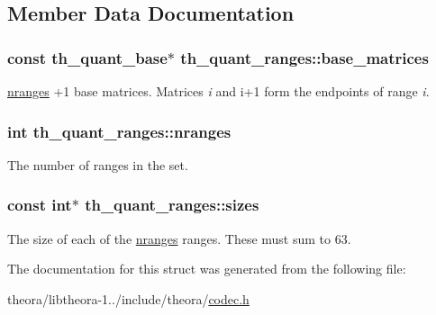 \subsection{Member Data Documentation}
\hypertarget{structth__quant__ranges_a52cb432f034737087492ea448de20bdb}{
\subsubsection[{base\+\_\+matrices}]{\setlength{\rightskip}{0pt plus 5cm}const {\bf th\+\_\+quant\+\_\+base}$\ast$ th\+\_\+quant\+\_\+ranges\+::base\+\_\+matrices}}\label{structth__quant__ranges_a52cb432f034737087492ea448de20bdb}
\hyperlink{structth__quant__ranges_a53e5a3d7f7a112100b4b670929b3ebab}{nranges} {\ttfamily +1} base matrices. Matrices {\itshape i} and {\ttfamily i+1} form the endpoints of range {\itshape i}. \hypertarget{structth__quant__ranges_a53e5a3d7f7a112100b4b670929b3ebab}{
\subsubsection[{nranges}]{\setlength{\rightskip}{0pt plus 5cm}int th\+\_\+quant\+\_\+ranges\+::nranges}}\label{structth__quant__ranges_a53e5a3d7f7a112100b4b670929b3ebab}
The number of ranges in the set. \hypertarget{structth__quant__ranges_af3188a373bc0b8ffaa330d0ab4c1a194}{
\subsubsection[{sizes}]{\setlength{\rightskip}{0pt plus 5cm}const int$\ast$ th\+\_\+quant\+\_\+ranges\+::sizes}}\label{structth__quant__ranges_af3188a373bc0b8ffaa330d0ab4c1a194}
The size of each of the \hyperlink{structth__quant__ranges_a53e5a3d7f7a112100b4b670929b3ebab}{nranges} ranges. These must sum to 63. 

The documentation for this struct was generated from the following file\+:\begin{DoxyCompactItemize}
\item 
theora/libtheora-\/1../include/theora/\hyperlink{theora_2libtheora-1_81_81_2include_2theora_2codec_8h}{codec.\+h}\end{DoxyCompactItemize}
